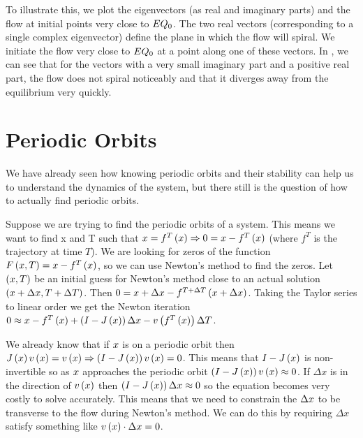 {To illustrate this, we plot the eigenvectors (as real and
imaginary parts) and the flow at initial points very close to
$EQ_{0}$. The two real vectors (corresponding to a single
complex eigenvector) define the plane in which the flow will
spiral. We initiate the flow very close to $EQ_{0}$ at a
point along one of these vectors. In ,
we can see that for the vectors with a very small imaginary
part and a positive real part, the flow does not spiral
noticeably and that it diverges away from the equilibrium very
quickly.

\section{Periodic Orbits}

We have already seen how knowing periodic orbits and their stability can help us to understand the dynamics of the system, but there still is the question of how to actually find periodic orbits.

Suppose we are trying to find the periodic orbits of a system. This means we want to find x and T such that $x = f^T\left(x\right) \Rightarrow 0 = x-f^T\left(x\right)$ (where $f^T$ is the trajectory at time $T$). We are looking for zeros of the function $F\left(x,T\right) = x - f^T\left(x\right)$, so we can use Newton's method to find the zeros. Let $\left(x,T\right)$ be an initial guess for Newton's method close to an actual solution $\left(x + \Delta x,T + \Delta T\right)$. Then $0 = x +\Delta x - f^{T+\Delta T}\left(x + \Delta x\right)$. Taking the Taylor series to linear order we get the Newton iteration $0 \approx x- f^T\left(x\right) + \left(I - J\left(x\right)\right)\Delta x - v\left(f^T\left(x\right)\right)\Delta T$.


We already know that if $x$ is on a periodic orbit then $J\left(x\right) v\left(x\right) = v\left(x\right) \Rightarrow \left(I-J\left(x\right)\right) v\left(x\right) = 0$. This means that $I-J\left(x\right)$ is non-invertible so as $x$ approaches the periodic orbit $\left(I-J\left(x\right)\right) v\left(x\right) \approx 0$. If $\Delta x$ is in the direction of $v\left(x\right)$ then $\left(I-J\left(x\right)\right) \Delta x \approx 0$ so the equation becomes very costly to solve accurately. This means that we need to constrain the $\Delta x$ to be transverse to the flow during Newton's method. We can do this by requiring $\Delta x$ satisfy something like $v\left(x\right) \cdot \Delta x = 0$.

}
